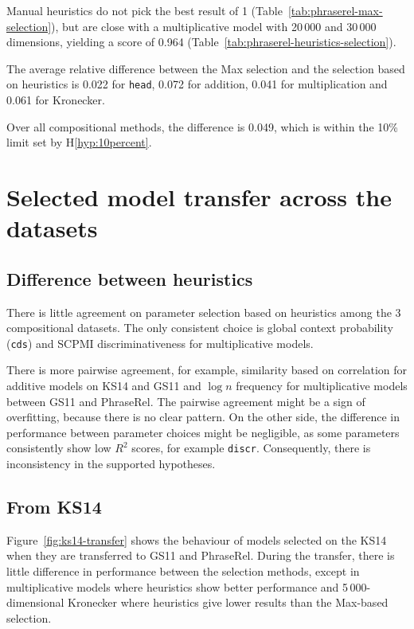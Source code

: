 Manual heuristics do not pick the best result of 1 (Table~\ref{tab:phraserel-max-selection}), but are close with a multiplicative model with 20\,000 and 30\,000 dimensions, yielding a score of 0.964 (Table~\ref{tab:phraserel-heuristics-selection}).

The average relative difference between the Max selection and the selection based on heuristics is 0.022 for \texttt{head}, 0.072 for addition, 0.041 for multiplication and 0.061 for Kronecker.

Over all compositional methods, the difference is 0.049, which is within the 10\% limit set by H\ref{hyp:10percent}.

\section{Selected model transfer across the datasets}
\label{sec:select-model-transf-comp}



\subsection{Difference between heuristics}
\label{sec:diff-betw-heur-comp}

There is little agreement on parameter selection based on heuristics among the 3 compositional datasets. The only consistent choice is global context probability (\texttt{cds}) and SCPMI discriminativeness for multiplicative models.

There is more pairwise agreement, for example, similarity based on correlation for additive models on KS14 and GS11 and $\log n$ frequency for multiplicative models between GS11 and PhraseRel. The pairwise agreement might be a sign of overfitting, because there is no clear pattern. On the other side, the difference in performance between parameter choices might be negligible, as some parameters consistently show low $R^2$ scores, for example \texttt{discr}. Consequently, there is inconsistency in the supported hypotheses.

\subsection{From KS14}
\label{sec:from-ks14}

Figure~\ref{fig:ks14-transfer} shows the behaviour of models selected on the KS14 when they are transferred to GS11 and PhraseRel. During the transfer, there is little difference in performance between the selection methods, except in multiplicative models where heuristics show better performance and 5\,000-dimensional Kronecker where heuristics give lower results than the Max-based selection.


